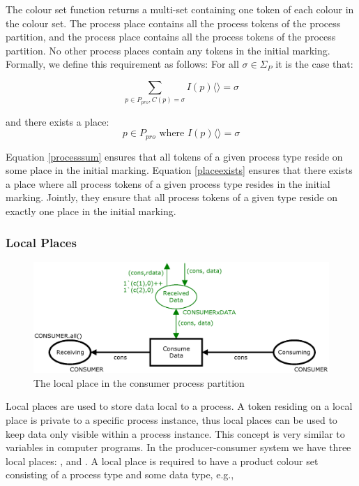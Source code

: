\noindent
The colour set function  returns a multi-set containing one token of each colour in the colour set. The process place  contains all the process tokens of the  process partition, and the process place  contains all the process tokens of the  process partition. No other process places contain any tokens in the initial marking. Formally, we define this requirement as follows: For all $\sigma \in \Sigma_{P} $ it is the case that:

\begin{equation}
\label{processsum}
\sum_{p \in P_{pro}, C(p) = \sigma} I(p)\langle \rangle = \sigma
\end{equation}

\noindent
and there exists a place:
\begin{equation}
\label{placeexists}
p \in P_{pro} \text{ where } I(p)\langle \rangle = \sigma
\end{equation}

\noindent
Equation \eqref{processsum} ensures that all tokens of a given process type reside on some place in the initial marking. Equation \eqref{placeexists} ensures that there exists a place where all process tokens of a given process type resides in the initial marking. Jointly, they ensure that all process tokens of a given type reside on exactly one place in the initial marking.

\subsubsection{Local Places}

\begin{figure}
\centering
\includegraphics[scale=0.45]{netclass/graphics/local_place.eps}
\caption{The local place  in the consumer process partition}
\label{fig:localplace}
\end{figure}

Local places are used to store data local to a process. A token residing on a local place is private to a specific process instance, thus local places can be used to keep data only visible within a process instance. This concept is very similar to variables in computer programs. In the producer-consumer system we have three local places: ,  and . A local place is required to have a product colour set consisting of a process type and some data type, e.g., 

